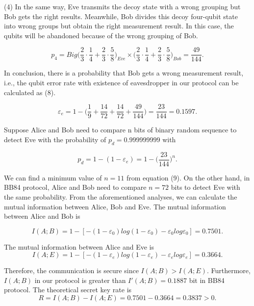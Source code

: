 \documentclass[a4paper,11pt]{article}
\begin{document}
(4) In the same way, Eve transmits the decoy state with a wrong grouping but Bob gets the right results. Meanwhile, Bob divides this decoy four-qubit state into wrong groups but
obtain the right measurement result. In this case, the qubits will be abandoned because of the wrong grouping of Bob.

\begin{equation*}
p_4 = Big(\dfrac{2}{3}\cdot \dfrac{1}{4} + 
\dfrac{2}{3} \cdot \dfrac{5}{8} \Big)_{Eve} \times \Big(\dfrac{2}{3}\cdot \dfrac{1}{4} + 
\dfrac{2}{3} \cdot \dfrac{5}{8} \Big)_{Bob} = \dfrac{49}{144}.
\end{equation*}

In conclusion, there is a probability that Bob gets a wrong measurement result, i.e., the qubit error rate with existence of eavesdropper in our protocol can be calculated as (8).

\begin{equation*}
\varepsilon_e = 1 - \Big(\dfrac{1}{9} + \dfrac{14}{72} + \dfrac{14}{72} + \dfrac{49}{144} \Big) = \dfrac{23}{144} = 0.1597.
\end{equation*}

Suppose Alice and Bob need to compare n bits of binary random sequence to detect Eve with the probability of $p_d = 0.999999999$ with

\begin{equation*}
p_d = 1 - (1-\varepsilon_e) = 1 - \Big(\dfrac{23}{144} \Big)^n.
\end{equation*}

We can find a minimum value of $n = 11$ from equation (9). On the other hand, in BB84 protocol, Alice and Bob need to compare $n = 72$ bits to detect Eve with the same probability. From the aforementioned analyses, we can calculate the mutual information between Alice, Bob and Eve. The mutual information between Alice and Bob is

\begin{equation*}
I(A; B) = 1 - [-(1-\varepsilon_0)log(1-\varepsilon_0) - \varepsilon_0 log \varepsilon_0] = 0.7501.
\end{equation*}

The mutual information between Alice and Eve is 
\begin{equation*}
I(A; E) = 1 - [-(1-\varepsilon_e)log(1-\varepsilon_e) - \varepsilon_e log \varepsilon_e] = 0.3664.
\end{equation*}

Therefore, the communication is secure since $I(A; B) > I(A; E)$. Furthermore, $I(A; B)$ in our protocol is greater than $I' (A; B) = 0.1887$ bit in BB84 protocol.
The theoretical secret key rate is
\begin{equation*}
R = I(A; B) - I(A; E) = 0.7501 - 0.3664 = 0.3837 > 0.
\end{equation*}
\end{document}
